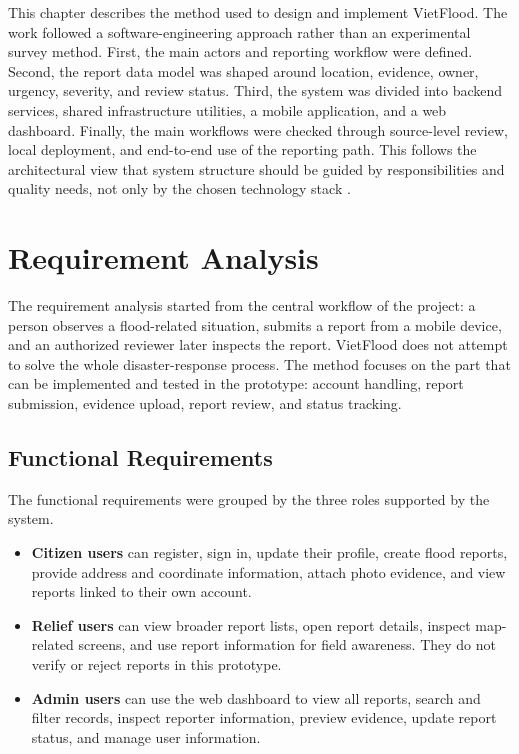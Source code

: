 This chapter describes the method used to design and implement VietFlood. The work followed a software-engineering approach rather than an experimental survey method. First, the main actors and reporting workflow were defined. Second, the report data model was shaped around location, evidence, owner, urgency, severity, and review status. Third, the system was divided into backend services, shared infrastructure utilities, a mobile application, and a web dashboard. Finally, the main workflows were checked through source-level review, local deployment, and end-to-end use of the reporting path. This follows the architectural view that system structure should be guided by responsibilities and quality needs, not only by the chosen technology stack \cite{bass2021softwareArchitecture}.

\section{Requirement Analysis}

The requirement analysis started from the central workflow of the project: a person observes a flood-related situation, submits a report from a mobile device, and an authorized reviewer later inspects the report. VietFlood does not attempt to solve the whole disaster-response process. The method focuses on the part that can be implemented and tested in the prototype: account handling, report submission, evidence upload, report review, and status tracking.

\subsection{Functional Requirements}

The functional requirements were grouped by the three roles supported by the system.

\begin{itemize}
    \item \textbf{Citizen users} can register, sign in, update their profile, create flood reports, provide address and coordinate information, attach photo evidence, and view reports linked to their own account.
    \item \textbf{Relief users} can view broader report lists, open report details, inspect map-related screens, and use report information for field awareness. They do not verify or reject reports in this prototype.
    \item \textbf{Admin users} can use the web dashboard to view all reports, search and filter records, inspect reporter information, preview evidence, update report status, and manage user information.
\end{itemize}

